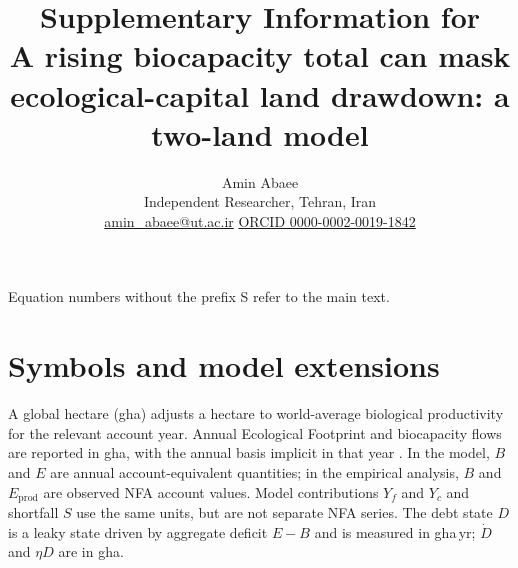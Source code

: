 \documentclass[11pt,a4paper]{article}
\title{Supplementary Information for\\[4pt]
\large A rising biocapacity total can mask ecological-capital land drawdown: a two-land model}
\author{Amin Abaee\\ \small Independent Researcher, Tehran, Iran\\ \small \href{mailto:amin_abaee@ut.ac.ir}{amin\_abaee@ut.ac.ir} \quad\href{https://orcid.org/0000-0002-0019-1842}{ORCID 0000-0002-0019-1842}}
\begin{document}
\maketitle

\noindent Equation numbers without the prefix S refer to the main text.

\section{Symbols and model extensions}\label{si:symbols}

A global hectare (gha) adjusts a hectare to world-average biological productivity for the relevant account year. Annual Ecological Footprint and biocapacity flows are reported in gha, with the annual basis implicit in that year \citep{GFNStandards2009,GFNGuidebook2019}. In the model, $B$ and $E$ are annual account-equivalent quantities; in the empirical analysis, $B$ and $E_{\mathrm{prod}}$ are observed NFA account values. Model contributions $Y_f$ and $Y_c$ and shortfall $S$ use the same units, but are not separate NFA series. The debt state $D$ is a leaky state driven by aggregate deficit $E-B$ and is measured in gha\,yr; $\dot D$ and $\eta D$ are in gha.
\end{document}
